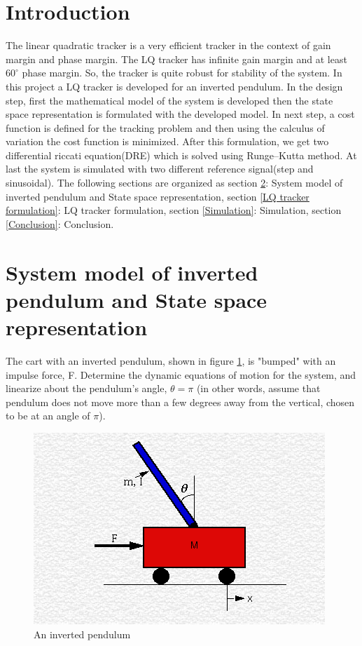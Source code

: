\documentclass[12pt]{article}
\begin{document}
\section{Introduction}
The linear quadratic tracker is a very efficient tracker in the context of gain margin and phase margin. The LQ tracker has infinite gain margin and at least $ 60^\circ $ phase margin. So, the tracker is quite robust for stability of the system. In this project a LQ tracker is developed for an inverted pendulum. In the design step, first the mathematical model of the system is developed then the state space representation is formulated with the developed model. In next step, a cost function is defined for the tracking problem and then using the calculus of variation the cost function is minimized. After this formulation, we get two differential riccati equation(DRE) which is solved using Runge–Kutta method. At last the system is simulated with two different reference signal(step and sinusoidal). The following sections are organized as section \ref{System model of inverted pendulum and State space representation}: System model of inverted pendulum and State space representation, section \ref{LQ tracker formulation}: LQ tracker formulation, section \ref{Simulation}: Simulation, section \ref{Conclusion}: Conclusion.
\newpage
\section{System model of inverted pendulum and State space representation \cite{ipendulam}}
 \label{System model of inverted pendulum and State space representation}
The cart with an inverted pendulum, shown in figure \ref{fig:cart}, is "bumped" with an impulse force, F. Determine the dynamic equations of motion for the system, and linearize about the pendulum's angle, $\theta = \pi$ (in other words, assume that pendulum does not move more than a few degrees away from the vertical, chosen to be at an angle of $\pi$).

\begin{figure}[h]
	\centering
	\includegraphics{cart.png}
	\caption{An inverted pendulum}
	\label{fig:cart}
\end{figure}
\end{document}

